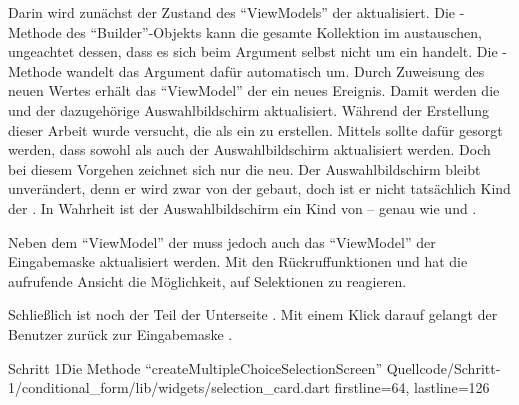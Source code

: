 Darin wird zunächst der Zustand des \enquote{ViewModels} der  aktualisiert.
Die -Methode des \enquote{Builder}-Objekts kann die gesamte Kollektion im  austauschen, ungeachtet dessen, dass es sich beim Argument selbst nicht um ein  handelt.
Die -Methode wandelt das Argument dafür automatisch um.
Durch Zuweisung des neuen Wertes erhält das \enquote{ViewModel} der  ein neues Ereignis.
Damit werden die  und der dazugehörige Auswahlbildschirm aktualisiert.
Während der Erstellung dieser Arbeit wurde versucht, die  als ein  zu erstellen.
Mittels  sollte dafür gesorgt werden, dass sowohl  als auch der Auswahlbildschirm aktualisiert werden.
Doch bei diesem Vorgehen zeichnet sich nur die  neu.
Der Auswahlbildschirm bleibt unverändert, denn er wird zwar von der  gebaut, doch ist er nicht tatsächlich Kind der .
In Wahrheit ist der Auswahlbildschirm ein Kind von  -- genau wie  und .

Neben dem \enquote{ViewModel} der  muss jedoch auch das \enquote{ViewModel} der Eingabemaske aktualisiert werden.
Mit den Rückruffunktionen   und   hat die aufrufende Ansicht die Möglichkeit, auf Selektionen zu reagieren.

Schließlich ist noch der  Teil der Unterseite .
Mit einem Klick darauf gelangt der Benutzer zurück zur Eingabemaske .


\begin{alexlisting}{Schritt 1}{Die Methode \enquote{createMultipleChoiceSelectionScreen}}
  {Quellcode/Schritt-1/conditional_form/lib/widgets/selection_card.dart}
  {firstline=64, lastline=126}
  \label{lst:Schritt1FunktionCreateMultipleChoiceSelectionScreen}
\end{alexlisting}
 